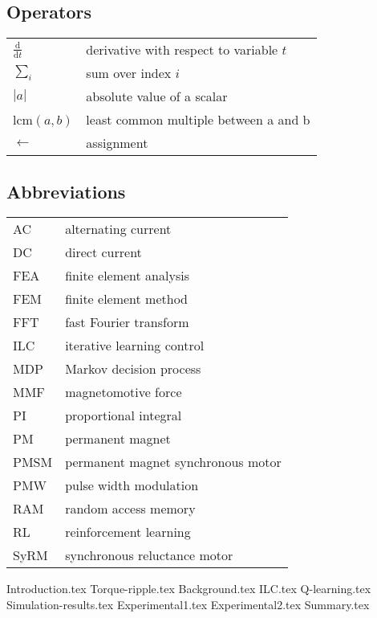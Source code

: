 \documentclass[english, 12pt, a4paper, elec, utf8, a-2b, online]{aaltothesis}
\begin{document}
\subsection*{Operators}

\begin{tabular}{ll}
$\displaystyle\frac{\mbox{d}}{\mbox{d} t}$ & derivative with respect to 
variable $t$\\[3mm]
$\sum_i $                       & sum over index $i$\\
$| a | $                         & absolute value of a scalar\\
lcm$({a,b})$ & least common multiple between a and b \\
$\leftarrow$ & assignment \\
\end{tabular}

\subsection*{Abbreviations}

\begin{tabular}{ll}
AC         & alternating current \\
DC         & direct current \\
FEA        & finite element analysis \\
FEM        & finite element method \\
FFT        & fast Fourier transform \\
ILC        & iterative learning control \\
MDP        & Markov decision process \\
MMF        & magnetomotive force \\
PI         & proportional integral \\
PM         & permanent magnet \\
PMSM       & permanent magnet synchronous motor \\
PMW        & pulse width modulation \\
RAM        & random access memory \\
RL         & reinforcement learning \\
SyRM       & synchronous reluctance motor \\
\end{tabular}

\cleardoublepage

{Introduction.tex}
{Torque-ripple.tex}
{Background.tex}
{ILC.tex}
{Q-learning.tex}
{Simulation-results.tex}
{Experimental1.tex}
{Experimental2.tex}
{Summary.tex}

\thesisbibliography


\end{document}

